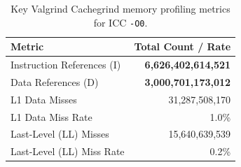 \begin{table}[H]
\centering
\caption{Key Valgrind Cachegrind memory profiling metrics for ICC \texttt{-O0}.}
\label{tab:cachegrind_results_o0}
\begin{tabular}{lr}
\toprule
\textbf{Metric} & \textbf{Total Count / Rate} \\
\midrule
Instruction References (I) & \textbf{6,626,402,614,521} \\
Data References (D)        & \textbf{3,000,701,173,012} \\
\midrule
L1 Data Misses             & 31,287,508,170 \\
L1 Data Miss Rate          & 1.0\% \\
\midrule
Last-Level (LL) Misses     & 15,640,639,539 \\
Last-Level (LL) Miss Rate  & 0.2\% \\
\bottomrule
\end{tabular}
\end{table}